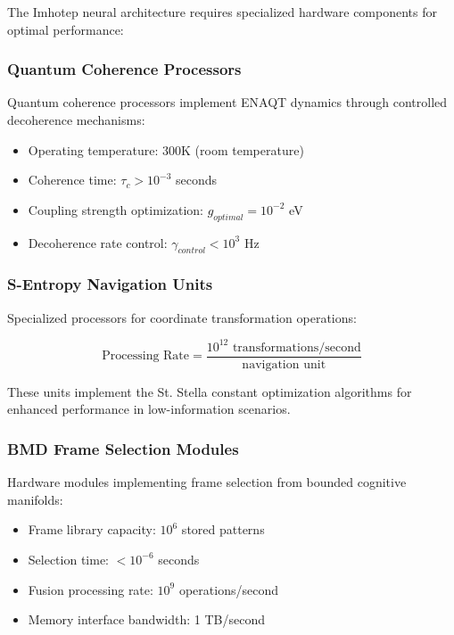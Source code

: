 \documentclass[12pt,a4paper]{article}
\theoremstyle{remark}
\begin{document}
The Imhotep neural architecture requires specialized hardware components for optimal performance:

\subsubsection{Quantum Coherence Processors}

Quantum coherence processors implement ENAQT dynamics through controlled decoherence mechanisms:

\begin{itemize}
\item Operating temperature: 300K (room temperature)
\item Coherence time: $\tau_c > 10^{-3}$ seconds
\item Coupling strength optimization: $g_{optimal} = 10^{-2}$ eV
\item Decoherence rate control: $\gamma_{control} < 10^3$ Hz
\end{itemize}

\subsubsection{S-Entropy Navigation Units}

Specialized processors for coordinate transformation operations:

\begin{equation}
\text{Processing Rate} = \frac{10^{12} \text{ transformations/second}}{\text{navigation unit}}
\end{equation}

These units implement the St. Stella constant optimization algorithms for enhanced performance in low-information scenarios.

\subsubsection{BMD Frame Selection Modules}

Hardware modules implementing frame selection from bounded cognitive manifolds:

\begin{itemize}
\item Frame library capacity: $10^6$ stored patterns
\item Selection time: $< 10^{-6}$ seconds
\item Fusion processing rate: $10^9$ operations/second
\item Memory interface bandwidth: 1 TB/second
\end{itemize}
\end{document}
